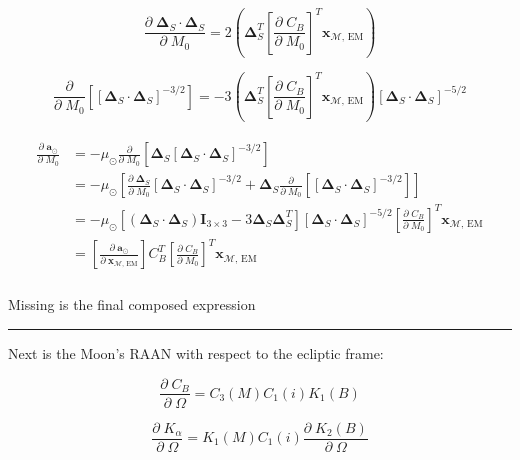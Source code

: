 \documentclass[]{article}
\newcommand{\pd}[2]{\frac{\partial\;#1}{\partial\;#2}}
\newcommand{\pddown}[2]{\frac{\partial}{\partial\;#2} \left[ #1 \right] }
\begin{document}
	\begin{equation*}
		\pd{\boldsymbol{\Delta}_S \cdot \boldsymbol{\Delta}_S}{M_0} = 2\left( \boldsymbol{\Delta}_S^T \left[ \pd{C_B}{M_0} \right]^T \mathbf{x}_{\mathcal{M}\text{, EM}} \right)
	\end{equation*}
	
	\begin{equation*}
		\pddown{ [\boldsymbol{\Delta}_S \cdot \boldsymbol{\Delta}_S]^{-3/2} }{M_0} = -3 \left( \boldsymbol{\Delta}_S^T \left[ \pd{C_B}{M_0} \right]^T \mathbf{x}_{\mathcal{M}\text{, EM}} \right) [\boldsymbol{\Delta}_S \cdot \boldsymbol{\Delta}_S]^{-5/2}
	\end{equation*}
	
	\begin{align}
	\begin{split}
		\pd{\mathbf{a}_{\odot}}{M_0} 
		&= -\mu_\odot \pddown{ \boldsymbol{\Delta}_S [\boldsymbol{\Delta}_S \cdot \boldsymbol{\Delta}_S]^{-3/2} }{M_0} \\
		&= -\mu_\odot \left[ \pd{ \boldsymbol{\Delta}_S }{M_0}[\boldsymbol{\Delta}_S \cdot \boldsymbol{\Delta}_S]^{-3/2} + \boldsymbol{\Delta}_S  \pddown{ [\boldsymbol{\Delta}_S \cdot \boldsymbol{\Delta}_S]^{-3/2} }{M_0} \right] \\
		&= -\mu_\odot \left[ (\boldsymbol{\Delta}_S \cdot \boldsymbol{\Delta}_S)\mathbf{I}_{3\times 3} - 3 \boldsymbol{\Delta}_S \boldsymbol{\Delta}_S^T \right] [\boldsymbol{\Delta}_S \cdot \boldsymbol{\Delta}_S]^{-5/2} \left[ \pd{C_B}{M_0} \right]^T \mathbf{x}_{\mathcal{M}\text{, EM}} \\
		&= \left[\pd{\mathbf{a}_{\odot}}{ \mathbf{x}_{\mathcal{M}\text{, EM}} }\right] C_B^T \left[ \pd{C_B}{M_0} \right]^T \mathbf{x}_{\mathcal{M}\text{, EM}} \\
	\end{split}
	\end{align}
	
	Missing is the final composed expression
	
	\hrule \vspace{1em}
	
	Next is the Moon's RAAN with respect to the ecliptic frame:
	
	\begin{equation*}
		\pd{C_B}{\Omega} = C_3(M) C_1(i) K_1(B)
	\end{equation*}
	
	\begin{equation*}
		\pd{K_\alpha}{\Omega} = K_1(M) C_1(i) \pd{K_2(B)}{\Omega}
	\end{equation*}
	
\end{document}
